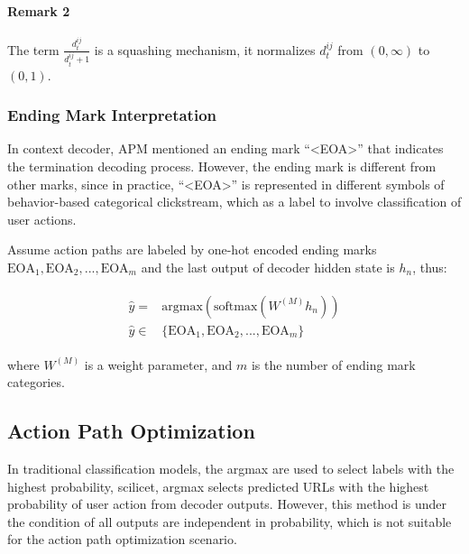 \paragraph{Remark 2} The term $\frac{d^{ij}_t}{d^{ij}_t + 1}$ is a squashing mechanism,
it normalizes $d^{ij}_t$ from $(0, \infty)$ to $(0, 1)$.


\subsubsection{Ending Mark Interpretation}
\label{sec:mark-interpretation}

In context decoder, APM mentioned an ending mark ``<EOA>'' that indicates the 
termination decoding process. However, the ending mark is different from other marks, 
since in practice, ``<EOA>'' is represented in different symbols of 
behavior-based categorical clickstream, which as a label to 
involve classification of user actions.

Assume action paths are labeled by one-hot encoded ending marks 
$\text{EOA}_1, \text{EOA}_2, ..., \text{EOA}_m$ and the last output
of decoder hidden state is $h_n$, thus:

\begin{align}
\label{eqn:mark}
\begin{split}
    \hat{y} =& \text{argmax} (\text{softmax} (W^{(M)} h_n)) \\
    \hat{y} \in& \{ \text{EOA}_1, \text{EOA}_2, ..., \text{EOA}_m \}
\end{split}
\end{align}

where $W^{(M)}$ is a weight parameter, and $m$ is the number of ending mark categories.

\subsection{Action Path Optimization}
\label{sec:optimization}

In traditional classification models, the argmax are used 
to select labels with the highest probability, scilicet, argmax selects predicted URLs 
with the highest probability of user action from decoder outputs. However, this method 
is under the condition of all outputs are independent in probability, which 
is not suitable for the action path optimization scenario.

